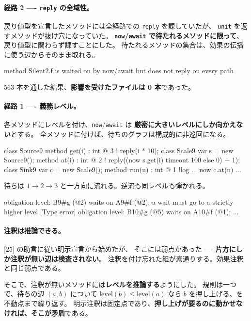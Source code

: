 \documentclass[11pt,a4paper]{ltjsarticle}
\theoremstyle{definition}
\theoremstyle{remark}
\begin{document}
\paragraph{経路 2 ---- \texttt{reply} の全域性。}
戻り値型を宣言したメソッドには全経路での \texttt{reply} を課していたが、
\texttt{unit} を返すメソッドが抜け穴になっていた。
\textbf{\texttt{now}/\texttt{await} で待たれるメソッドに限って}、
戻り値型に関わらず課すことにした。
待たれるメソッドの集合は、効果の伝播に使う辺からそのまま取れる。

\begin{term}
 method Silent2.f is waited on by now/await
             but does not reply on every path
\end{term}

563 本を通した結果、\textbf{影響を受けたファイルは 0 本}であった。

\paragraph{経路 1 ---- 義務レベル。}
各メソッドにレベルを付け、\texttt{now}/\texttt{await} は
\textbf{厳密に大きいレベルにしか向かえない}とする。
全メソッドに付けば、待ちのグラフは構成的に非巡回になる。

\begin{aipl}
class Source9 { method get(i) : int @ 3 !{} { reply(i * 10); } }
class Scale9  {
  var s = new Source9();
  method at(i) : int @ 2 !{} { reply((now s.get(i) timeout 100 else 0) + 1); }
}
class Sink9 {
  var c = new Scale9();
  method run(n) : int @ 1 !{log} { ... now c.at(n) ... }
}
\end{aipl}

待ちは $1 \to 2 \to 3$ と一方向に流れる。逆流も同レベルも弾かれる。

\begin{term}
 obligation level: B9#g (@2) waits on A9#f (@2);
             a wait must go to a strictly higher level
[Type error] obligation level: B10#g (@5) waits on A10#f (@1); ...
\end{term}

\paragraph{注釈は推論できる。}
[25] の助言に従い明示宣言から始めたが、
そこには弱点があった ---- \textbf{片方にしか注釈が無い辺は検査されない}。
注釈を付け忘れた組が素通りする。効果注釈と同じ弱点である。

そこで、注釈が無いメソッドには\textbf{レベルを推論する}ようにした。
規則は一つで、待ちの辺 $(a, b)$ について
$\mathrm{level}(b) \le \mathrm{level}(a)$ なら $b$ を押し上げる、を不動点まで繰り返す。
明示注釈は固定点であり、\textbf{押し上げが要るのに動かせなければ、そこが矛盾}である。
\end{document}
